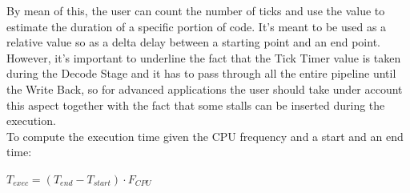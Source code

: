 By mean of this, the user can count the number of ticks and use the value to estimate the duration of a specific portion of code. It's meant to be used as a relative value so as a delta delay between a starting point and an end point.\\

However, it's important to underline the fact that the Tick Timer value is taken during the Decode Stage and it has to pass through all the entire pipeline until the Write Back, so for advanced applications the user should take under account this aspect together with the fact that some stalls can be inserted during the execution. \\ 

To compute the execution time given the CPU frequency and a start and an end time:

\begin{center}
	$ T_{exec} = (T_{end} - T_{start}) \cdot F_{CPU} $
\end{center}